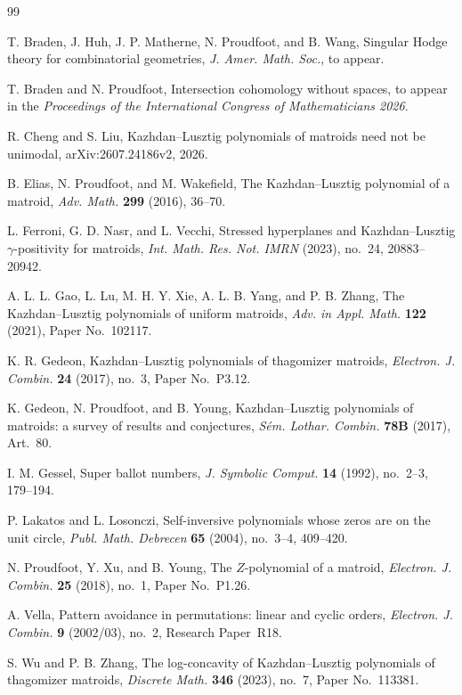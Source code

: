 \documentclass[11pt]{article}
\theoremstyle{plain}
\theoremstyle{remark}
\begin{document}
\begin{thebibliography}{99}

T. Braden, J. Huh, J. P. Matherne, N. Proudfoot, and B. Wang,
\newblock Singular Hodge theory for combinatorial geometries,
\newblock \emph{J. Amer. Math. Soc.}, to appear.

T. Braden and N. Proudfoot,
\newblock Intersection cohomology without spaces,
\newblock to appear in the \emph{Proceedings of the International Congress of Mathematicians 2026}.

R. Cheng and S. Liu,
\newblock Kazhdan--Lusztig polynomials of matroids need not be unimodal,
\newblock arXiv:2607.24186v2, 2026.

B. Elias, N. Proudfoot, and M. Wakefield,
\newblock The Kazhdan--Lusztig polynomial of a matroid,
\newblock \emph{Adv. Math.} \textbf{299} (2016), 36--70.

L. Ferroni, G. D. Nasr, and L. Vecchi,
\newblock Stressed hyperplanes and Kazhdan--Lusztig $\gamma$-positivity for matroids,
\newblock \emph{Int. Math. Res. Not. IMRN} (2023), no.~24, 20883--20942.

A. L. L. Gao, L. Lu, M. H. Y. Xie, A. L. B. Yang, and P. B. Zhang,
\newblock The Kazhdan--Lusztig polynomials of uniform matroids,
\newblock \emph{Adv. in Appl. Math.} \textbf{122} (2021), Paper No.~102117.

K. R. Gedeon,
\newblock Kazhdan--Lusztig polynomials of thagomizer matroids,
\newblock \emph{Electron. J. Combin.} \textbf{24} (2017), no.~3, Paper No.~P3.12.

K. Gedeon, N. Proudfoot, and B. Young,
\newblock Kazhdan--Lusztig polynomials of matroids: a survey of results and conjectures,
\newblock \emph{S\'em. Lothar. Combin.} \textbf{78B} (2017), Art.~80.

I. M. Gessel,
\newblock Super ballot numbers,
\newblock \emph{J. Symbolic Comput.} \textbf{14} (1992), no.~2--3, 179--194.

P. Lakatos and L. Losonczi,
\newblock Self-inversive polynomials whose zeros are on the unit circle,
\newblock \emph{Publ. Math. Debrecen} \textbf{65} (2004), no.~3--4, 409--420.

N. Proudfoot, Y. Xu, and B. Young,
\newblock The $Z$-polynomial of a matroid,
\newblock \emph{Electron. J. Combin.} \textbf{25} (2018), no.~1, Paper No.~P1.26.

A. Vella,
\newblock Pattern avoidance in permutations: linear and cyclic orders,
\newblock \emph{Electron. J. Combin.} \textbf{9} (2002/03), no.~2,
Research Paper~R18.

S. Wu and P. B. Zhang,
\newblock The log-concavity of Kazhdan--Lusztig polynomials of thagomizer matroids,
\newblock \emph{Discrete Math.} \textbf{346} (2023), no.~7, Paper No.~113381.

\end{thebibliography}
\end{document}
